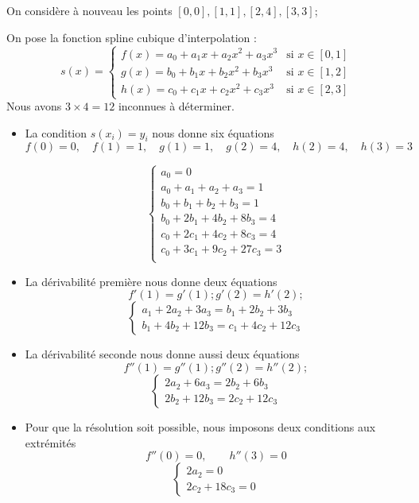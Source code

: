 \documentclass{beamer}
\begin{document}
\begin{frame}
On considère à nouveau les points $[0,0],[1,1],[2,4],[3,3]$;

 On pose la fonction spline cubique d'interpolation :
  \[s(x)=\left\{\begin{array}{ll}
 f(x)=a_0+a_1x+a_2x^2+a_3x^3 &\mbox{si } x\in [0,1]\\
 g(x)=b_0+b_1x+b_2x^2+b_3x^3 & \mbox{si } x\in [1,2]\\
 h(x)=c_0+c_1x+c_2x^2+c_3x^3& \mbox{si } x\in [2,3]
  \end{array}\right.
 \] 
 Nous avons $3\times 4=12$ inconnues à déterminer.
 \begin{itemize}
 \item La condition $s(x_i)=y_i$ nous donne six équations
 \[f(0)=0, \quad f(1)=1, \quad g(1)=1, \quad g(2)=4, \quad h(2)=4, \quad h(3)=3\]
 
 \[\left\{\begin{array}{l}
                                a_0 = 0\\
                    a_0 + a_1 + a_2 + a_3 = 1\\
                    b_0 + b_1 + b_2 + b_3 = 1\\
                    b_0 + 2 b_1 + 4 b_2 + 8 b_3 = 4\\
                    c_0 + 2 c_1 + 4 c_2 + 8 c_3 = 4\\
                    c_0 + 3 c_1 + 9 c_2 + 27 c_3 = 3\\
 \end{array}\right.
 \]
 
 \end{itemize}
 \end{frame}


\begin{frame}
 
 \begin{itemize}
\item La dérivabilité première nous donne deux équations
 \[f'(1)=g'(1);g'(2)=h'(2);\]
 \[\left\{\begin{array}{l}
    a_1 + 2 a_2 + 3 a_3 = b_1 + 2 b_2 + 3 b_3\\
    b_1 + 4 b_2 + 12 b_3 = c_1 + 4 c_2 + 12 c_3
 \end{array}\right.
 \]    
\item La dérivabilité seconde nous donne aussi deux équations
 \[f''(1)=g''(1);g''(2)=h''(2);\]
  \[\left\{\begin{array}{l}
  2 a_2 + 6 a_3 = 2 b_2 + 6 b_3\\
  2 b_2 + 12 b_3 = 2 c_2 + 12 c_3
 \end{array}\right.
 \]                 
\item Pour que la résolution soit possible, nous imposons deux conditions aux extrémités
 \[f''(0)=0, \qquad h''(3)=0\]
\[\left\{\begin{array}{l}
 2 a_2 = 0\\
 2 c_2 + 18 c_3 = 0
 \end{array}\right.
 \]  

 
 \end{itemize}
 
 
\end{frame}
\end{document}

